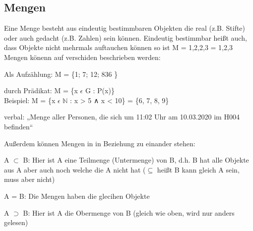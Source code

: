\documentclass[a4paper,10pt]{scrartcl}
\begin{document}
        \subsection{Mengen}
        Eine Menge besteht aus eindeutig bestimmbaren Objekten die real (z.B. Stifte) oder auch gedacht (z.B. Zahlen) sein können. Eindeutig bestimmbar heißt auch,
        dass Objekte nicht mehrmals auftauchen können so ist M = {1,2,2,3} = {1,2,3}\\
        Mengen könenn auf verschiden beschrieben werden:
        \begin{description}
            \item Als Aufzählung: M = \{1; 7; 12; 836 \} 
            \item durch Prädikat: M = \{x $\epsilon$ G : P(x)\} \\ 
                Beispiel: M = \{x $\epsilon$ $\mathbb{N}$ : x > 5 ∧ x < 10\} = \{6, 7, 8, 9\}
            \item verbal: „Menge aller Personen, die sich um 11:02 Uhr am 10.03.2020 im H004 befinden“
        \end{description}
        Außerdem können Mengen in in Beziehung zu einander stehen:
        \begin{description}
            \item A $\subset$ B: Hier ist A eine Teilmenge (Untermenge) von B, d.h. B hat alle Objekte aus A aber auch noch welche die A nicht hat ($\subseteq$ heißt B kann gleich A sein, muss aber nicht)
            \item A = B: Die Mengen haben die glecihen Objekte
            \item A $\supset$ B: Hier ist A die Obermenge von B (gleich wie oben, wird nur anders gelesen)
        \end{description}
\end{document}
